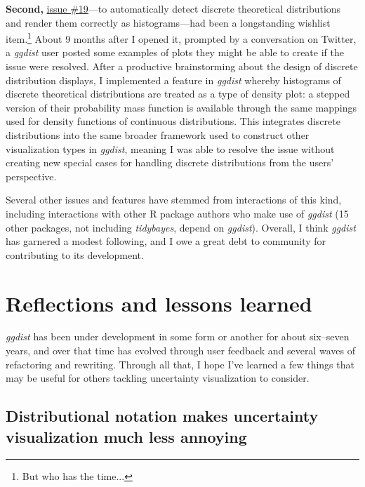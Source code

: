 \documentclass[journal]{vgtc}                     %
\begin{document}
\textbf{Second,} \href{https://github.com/mjskay/ggdist/issues/19}{issue \#19}---to automatically detect discrete theoretical distributions and render them correctly as histograms---had been a longstanding wishlist item.\footnote{But who has the time...} About 9 months after I opened it, prompted by a conversation on Twitter, a \textit{ggdist} user posted some examples of plots they might be able to create if the issue were resolved. After a productive brainstorming about the design of discrete distribution displays, I implemented a feature in \textit{ggdist} whereby histograms of discrete theoretical distributions are treated as a type of density plot: a stepped version of their probability mass function is available through the same mappings used for density functions of continuous distributions. This integrates discrete distributions into the same broader framework used to construct other visualization types in \textit{ggdist}, meaning I was able to resolve the issue without creating new special cases for handling discrete distributions from the users' perspective.

Several other issues and features have stemmed from interactions of this kind, including interactions with other R package authors who make use of \textit{ggdist}  (15 other packages, not including \textit{tidybayes}, depend on \textit{ggdist}). Overall, I think \textit{ggdist} has garnered a modest following, and I owe a great debt to community for contributing to its development.

\section{Reflections and lessons learned}

\textit{ggdist} has been under development in some form or another for about six--seven years, and over that time has evolved through user feedback and several waves of refactoring and rewriting. Through all that, I hope I've learned a few things that may be useful for others tackling uncertainty visualization to consider.

\subsection{Distributional notation makes uncertainty visualization much less annoying}

\end{document}
